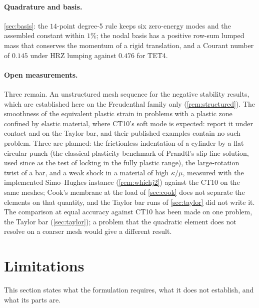 \documentclass{article}
\theoremstyle{definition}
\theoremstyle{plain}
\begin{document}
\paragraph{Quadrature and basis.} \cref{sec:basis}: the $14$-point degree-5
rule keeps six zero-energy modes and the assembled constant within $1\%$; the
nodal basis has a positive row-sum lumped mass that conserves the momentum
of a rigid translation, and a Courant number of $0.145$ under HRZ lumping
against $0.476$ for TET4.

\paragraph{Open measurements.} Three remain. An unstructured mesh sequence
for the negative stability results, which are established here on the
Freudenthal family only (\cref{rem:structured}). The smoothness of the
equivalent plastic strain in problems with a plastic zone confined by
elastic material, where CT10's soft mode is expected:
\textcite{Foulk.etal:2021} report it under contact and on the Taylor bar, and
their published examples contain no such problem. Three are planned: the
frictionless indentation of a cylinder by a flat circular punch (the
classical plasticity benchmark of Prandtl's slip-line solution, used since
\textcite{Nagtegaal.etal:1974} as the test of locking in the fully plastic
range), the large-rotation twist of a bar, and a weak shock in a material
of high $\kappa/\mu$, measured with the
implemented Simo--Hughes instance (\cref{rem:whichj2}) against the
CT10 on the same meshes; Cook's membrane at the load of
\cref{sec:cook} does not separate the elements on that quantity, and
the Taylor bar runs of \cref{sec:taylor} did not write it. The comparison
at equal accuracy against CT10 has been made on one
problem, the Taylor bar (\cref{sec:taylor}); a problem that the
quadratic element does not resolve on a coarser mesh would give a
different result.

\section{Limitations}
\label{sec:risks}

This section states what the formulation requires, what it does not
establish, and what its parts are.
\end{document}

